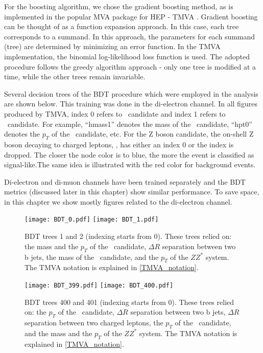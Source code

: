 For the boosting algorithm, we chose the gradient boosting method, as is implemented in the popular MVA package for HEP - TMVA \cite{Hocker:2007ht}. Gradient boosting can be thought of as a function expansion approach. In this case, each tree corresponds to a summand. In this approach, the parameters for each summand (tree) are determined by minimizing an error function. In the TMVA implementation, the binomial log-likelihood loss function is used. The adopted procedure follows the greedy algorithm approach - only one tree is modified at a time, while the other trees remain invariable.

Several decision trees of the BDT procedure which were employed in the analysis are shown below. This training was done in the di-electron channel. In all figures produced by TMVA, index 0 refers to \HZZ~candidate and index 1 refers to \HBB~candidate. For example, ``hmass1'' denotes the mass of the \HZZ~candidate, ``hpt0'' denotes the $p_T$ of the \HBB~candidate, etc. For the Z boson candidate, the on-shell Z boson decaying to charged leptons, \Zll, has either an index 0 or the index is dropped. The closer the node color is to blue, the more the event is classified as signal-like.The same idea is illustrated with the red color for background events. \label{TMVA_notation}

Di-electron and di-muon channels have been trained separately and the BDT metrics (discussed later in this chapter) show similar performance. To save space, in this chapter we show mostly figures related to the di-electron channel.

\begin{figure}[H]
\begin{center}
\texttt{[image: BDT\_0.pdf]}
\texttt{[image: BDT\_1.pdf]}\\
\caption[BDT trees 1 and 2.]{BDT trees 1 and 2 (indexing starts from 0). These trees relied on: the mass and the $p_T$ of the \Zll~candidate, $\Delta R$ separation between two b jets, the mass of the \HBB~candidate, and the $p_T$ of the $ZZ^*$ system. The TMVA notation is explained in \ref{TMVA_notation}.}
\label{fig:bdt_trees}
\end{center}
\end{figure}

\begin{figure}[H]
\begin{center}
\texttt{[image: BDT\_399.pdf]}
\texttt{[image: BDT\_400.pdf]}\\
\caption[BDT trees 400 and 401.]{BDT trees 400 and 401 (indexing starts from 0). These trees relied on: the $p_T$ of the \Zll~candidate, 
$\Delta R$ separation between two b jets,
$\Delta R$ separation between two charged leptons, 
the $p_T$ of the \HBB~candidate, and the mass and the $p_T$ of the $ZZ^*$ system. The TMVA notation is explained in \ref{TMVA_notation}.} 
\label{fig:bdt_trees_2}
\end{center}
\end{figure}


